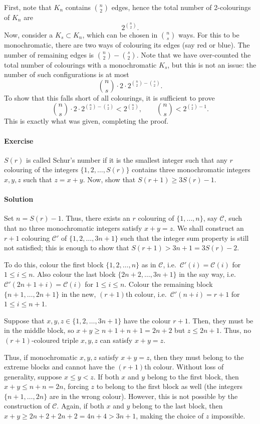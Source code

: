 \documentclass[10pt]{article}
\newcounter{prob}
\newcommand{\problem}{\stepcounter{prob}\paragraph{Exercise \arabic{prob}}}
\newcommand{\solution}{\paragraph{Solution}}
\begin{document}
    First, note that $K_n$ contains $\binom{n}{2}$ edges, hence the total number of
    2-colourings of $K_n$ are \[
        2^{\binom{n}{2}}.
    \] Now, consider a $K_s \subset K_n$, which can be chosen in $\binom{n}{s}$ ways.
    For this to be monochromatic, there are two ways of colouring its edges (say red
    or blue). The number of remaining edges is $\binom{n}{2} - \binom{s}{2}$. Note
    that we have over-counted the total number of colourings with a monochromatic
    $K_s$, but this is not an issue: the number of such configurations is at most \[
        \binom{n}{s}\cdot 2\cdot 2^{\binom{n}{2} - \binom{s}{2}}.
    \] To show that this falls short of all colourings, it is sufficient to prove \[
        \binom{n}{s}\cdot 2\cdot 2^{\binom{n}{2} - \binom{s}{2}} < 2^{\binom{n}{2}},
        \qquad
        \binom{n}{s} < 2^{\binom{s}{2} - 1}.
    \] This is exactly what was given, completing the proof.

    \problem $S(r)$ is called Schur's number if it is the smallest integer such that
    any $r$ colouring of the integers $\{1, 2, \dots, S(r)\}$ contains three
    monochromatic integers $x, y, z$ such that $z = x + y$. Now, show that $S(r + 1)
    \geq 3S(r) - 1$.

    \solution Set $n = S(r) - 1$. Thus, there exists an $r$ colouring of $\{1, \dots,
    n\}$, say $\mathscr{C}$, such that no three monochromatic integers satisfy $x + y
    = z$. We shall construct an $r + 1$ colouring $\mathscr{C}'$ of $\{1, 2, \dots,
    3n + 1\}$ such that the integer sum property is still not satisfied; this is
    enough to show that $S(r + 1) > 3n + 1 = 3S(r) - 2$.

    To do this, colour the first block $\{1, 2, \dots, n\}$ as in $\mathscr{C}$,
    i.e.\ $\mathscr{C}'(i) = \mathscr{C}(i)$ for $1 \leq i \leq n$. Also colour the
    last block $\{2n + 2, \dots, 3n + 1\}$ in the say way, i.e.\ $\mathscr{C}'(2n + 1
    + i) = \mathscr{C}(i)$ for $1 \leq i \leq n$. Colour the remaining block $\{n +
    1, \dots, 2n + 1\}$ in the new, $(r + 1)$th colour, i.e.\ $\mathscr{C}'(n + i) =
    r + 1$ for $1 \leq i \leq n + 1$.

    Suppose that $x, y, z \in \{1, 2, \dots, 3n + 1\}$ have the colour $r + 1$. Then,
    they must be in the middle block, so $x + y \geq n + 1 + n + 1 = 2n + 2$ but $z
    \leq 2n + 1$. Thus, no $(r + 1)$-coloured triple $x, y, z$ can satisfy $x + y =
    z$.

    Thus, if monochromatic $x, y, z$ satisfy $x + y = z$, then they must belong to
    the extreme blocks and cannot have the $(r + 1)$th colour. Without loss of
    generality, suppose $x \leq y < z$. If both $x$ and $y$ belong to the first
    block, then $x + y \leq n + n = 2n$, forcing $z$ to belong to the first block as
    well (the integers $\{n + 1, \dots, 2n\}$ are in the wrong colour). However, this
    is not possible by the construction of $\mathscr{C}$. Again, if both $x$ and $y$
    belong to the last block, then $x + y \geq 2n + 2 + 2n + 2 = 4n + 4 > 3n + 1$,
    making the choice of $z$ impossible.
\end{document}
